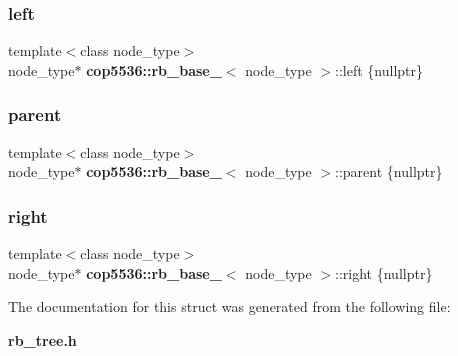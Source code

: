 \subsubsection{left}
{\footnotesize\ttfamily template$<$class node\+\_\+type$>$ \\
node\+\_\+type$\ast$ \textbf{ cop5536\+::rb\+\_\+base\+\_\+}$<$ node\+\_\+type $>$\+::left \{nullptr\}}

\mbox{\label{structcop5536_1_1rb__base___abb5b6328ffd04e3eceb6f357cfd9807a}} 
\subsubsection{parent}
{\footnotesize\ttfamily template$<$class node\+\_\+type$>$ \\
node\+\_\+type$\ast$ \textbf{ cop5536\+::rb\+\_\+base\+\_\+}$<$ node\+\_\+type $>$\+::parent \{nullptr\}}

\mbox{\label{structcop5536_1_1rb__base___a3060f1f117246dbce8b58fc55b8d3bd8}} 
\subsubsection{right}
{\footnotesize\ttfamily template$<$class node\+\_\+type$>$ \\
node\+\_\+type$\ast$ \textbf{ cop5536\+::rb\+\_\+base\+\_\+}$<$ node\+\_\+type $>$\+::right \{nullptr\}}



The documentation for this struct was generated from the following file\+:\begin{DoxyCompactItemize}
\item 
\textbf{ rb\+\_\+tree.\+h}\end{DoxyCompactItemize}
